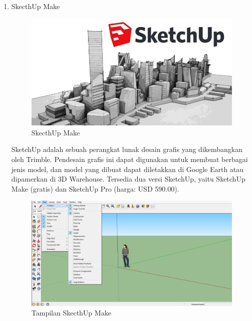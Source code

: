 \begin{enumerate}
\item SkecthUp Make
\begin{figure}[H]
\centering
\includegraphics[width=1\textwidth]{figures/skecthup1.png}
\caption{SkecthUp Make}
\label{print}
\end{figure}
    \par SketchUp adalah sebuah perangkat lunak desain grafis yang dikembangkan oleh Trimble. Pendesain grafis ini dapat digunakan untuk membuat berbagai jenis model, dan model yang dibuat dapat diletakkan di Google Earth atau dipamerkan di 3D Warehouse. Tersedia dua versi SketchUp, yaitu SketchUp Make (gratis) dan SketchUp Pro (harga: USD 590.00).
    \begin{figure}[H]
\centering
\includegraphics[width=1\textwidth]{figures/skecthup2.png}
\caption{Tampilan SkecthUp Make}
\label{print}
\end{figure}
    

\end{enumerate}
